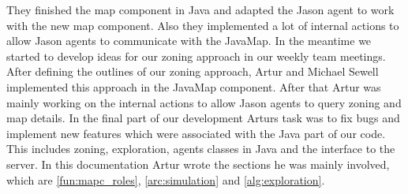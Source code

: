 They finished the map component in Java and adapted the Jason agent to work with the new map component.
Also they implemented a lot of internal actions to allow Jason agents to communicate with the JavaMap.
In the meantime we started to develop ideas for our zoning approach in our weekly team meetings.
After defining the outlines of our zoning approach, Artur and Michael Sewell implemented this approach in the JavaMap component.
After that Artur was mainly working on the internal actions to allow Jason agents to query zoning and map details.
In the final part of our development Arturs task was to fix bugs and implement new features which were associated with the Java part of our code.
This includes zoning, exploration, agents classes in Java and the interface to the server.
In this documentation Artur wrote the sections he was mainly involved, which are \autoref{fun:mapc_roles}, \autoref{arc:simulation} and \autoref{alg:exploration}.
